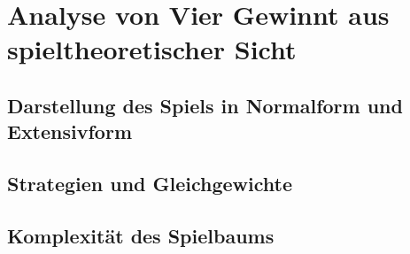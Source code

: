 \chapter{Analyse von Vier Gewinnt aus spieltheoretischer Sicht}

\section{Darstellung des Spiels in Normalform und Extensivform}
\section{Strategien und Gleichgewichte}
\section{Komplexität des Spielbaums}
	